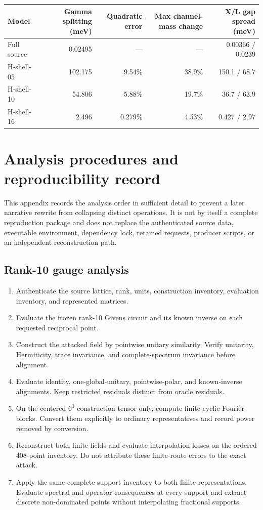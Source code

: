 \documentclass[11pt]{article}
\theoremstyle{definition}
\begin{document}
\scriptsize
\begin{center}
\begin{tabular}{@{}lrrrr@{}}
\toprule
Model & Gamma splitting (meV) & Quadratic error & Max channel-mass change & X/L gap spread (meV)\\
\midrule
Full source & 0.02495 & --- & --- & 0.00366 / 0.0239\\
H-shell-05 & 102.175 & 9.54\% & 38.9\% & 150.1 / 68.7\\
H-shell-10 & 54.806 & 5.88\% & 19.7\% & 36.7 / 63.9\\
H-shell-16 & 2.496 & 0.279\% & 4.53\% & 0.427 / 2.97\\
\bottomrule
\end{tabular}
\end{center}
\normalsize

\section{Analysis procedures and reproducibility record}

This appendix records the analysis order in sufficient detail to prevent a later
narrative rewrite from collapsing distinct operations.  It is not by itself a complete
reproduction package and does not replace the authenticated source data, executable
environment, dependency lock, retained requests, producer scripts, or an independent
reconstruction path.

\subsection{Rank-10 gauge analysis}

\begin{enumerate}[leftmargin=2em]
 \item Authenticate the source lattice, rank, units, construction inventory, evaluation
 inventory, and represented matrices.
 \item Evaluate the frozen rank-10 Givens circuit and its known inverse on each requested
 reciprocal point.
 \item Construct the attacked field by pointwise unitary similarity.  Verify unitarity,
 Hermiticity, trace invariance, and complete-spectrum invariance before alignment.
 \item Evaluate identity, one-global-unitary, pointwise-polar, and known-inverse
 alignments.  Keep restricted residuals distinct from oracle residuals.
 \item On the centered $6^3$ construction tensor only, compute finite-cyclic Fourier
 blocks.  Convert them explicitly to ordinary representatives and record power removed
 by conversion.
 \item Reconstruct both finite fields and evaluate interpolation losses on the ordered
 408-point inventory.  Do not attribute these finite-route errors to the exact attack.
 \item Apply the same complete support inventory to both finite representations.
 Evaluate spectral and operator consequences at every support and extract discrete
 non-dominated points without interpolating fractional supports.
\end{enumerate}
\end{document}
